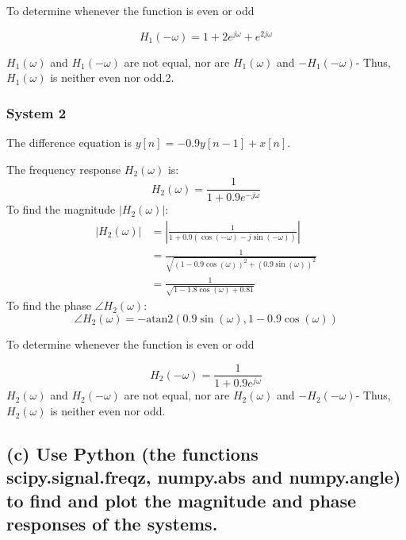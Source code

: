 To determine whenever the function is even or odd

\begin{equation*}
    H_{1}(-\omega)=1+2 e^{j \omega}+e^{2 j \omega}
\end{equation*}

$ H_{1}(\omega) $ and $ H_{1}(-\omega) $ are not equal, nor are $ H_{1}(\omega) $ and $ -H_{1}(-\omega) $- Thus, $ H_{1}(\omega) $ is neither even nor odd.2.

\subsubsection*{System 2}

The difference equation is $ y[n] = -0.9y[n-1] + x[n] $.

The frequency response $ H_2(\omega) $ is:
\begin{equation*}
H_2(\omega) = \frac{1}{1 + 0.9e^{-j\omega}}
\end{equation*}
To find the magnitude $ |H_2(\omega)| $:
\begin{equation*}
\begin{aligned}
|H_2(\omega)| &= \left| \frac{1}{1 + 0.9(\cos(-\omega) - j\sin(-\omega))} \right| \\
&= \frac{1}{\sqrt{(1 - 0.9\cos(\omega))^2 + (0.9\sin(\omega))^2}} \\
&= \frac{1}{\sqrt{1 - 1.8\cos(\omega) + 0.81}}
\end{aligned}
\end{equation*}
To find the phase $ \angle H_2(\omega) $:
\begin{equation*}
\angle H_2(\omega) = -\text{atan2}(0.9 \sin(\omega), 1 - 0.9 \cos(\omega))
\end{equation*}

To determine whenever the function is even or odd

\begin{equation*}
    H_{2}(-\omega)=\frac{1}{1+0.9 e^{j \omega}} 
\end{equation*}
 $ H_{2}(\omega) $ and $ H_{2}(-\omega) $ are not equal, nor are $ H_{2}(\omega) $ and $ -H_{2}(-\omega) $- Thus, $ H_{2}(\omega) $ is neither even nor odd.

 \subsection*{(c) Use Python (the functions scipy.signal.freqz, numpy.abs and numpy.angle) to find
 and plot the magnitude and phase responses of the systems.}


